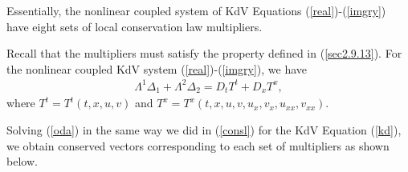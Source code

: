 \begin{rem}
Essentially, the nonlinear coupled system of KdV Equations (\ref{real})-(\ref{imgry}) have eight sets of local conservation law multipliers.
\end{rem}
\begin{rem} Recall that the multipliers must satisfy the property defined in (\ref{sec2.9.13}). For the nonlinear coupled KdV system  (\ref{real})-(\ref{imgry}), we have
	\begin{align}
	\label{oda}		\Lambda^1  \Delta_1+ \Lambda^2 \Delta_2 = D_t T^t + D_x T^x,
	\end{align} where 
	$T^t=T^t(t,x,u,v)$	and $T^x=T^x(t,x,u,v,u_x,v_x,u_{xx},v_{xx}).$	
\end{rem}
Solving (\ref{oda}) in the same way we did in  (\ref{consl}) for the KdV Equation (\ref{kd}), we obtain conserved vectors  corresponding to each set of multipliers as shown below.
